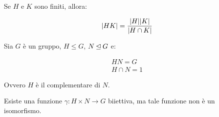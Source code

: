 \begin{teorema}
	\label{thr:ordine_prodotto_sottogruppi}
	Se $H$ e $K$ sono finiti, allora:

	\begin{equation*}
		\lvert HK \rvert = \dfrac{\lvert H \rvert\lvert K \rvert}{\lvert H \cap K \rvert}
	\end{equation*}
\end{teorema}

\begin{esercizio}
	Sia $G$ è un gruppo, $H \le G$, $N \unlhd G$ e:
	
	\begin{gather}
		HN = G \\
		H \cap N = 1
	\end{gather}

	Ovvero $H$ è il complementare di $N$.
	
	Esiste una funzione $\gamma: H \times N \longrightarrow G$ biiettiva, ma tale funzione non è un isomorfismo.
\end{esercizio}
